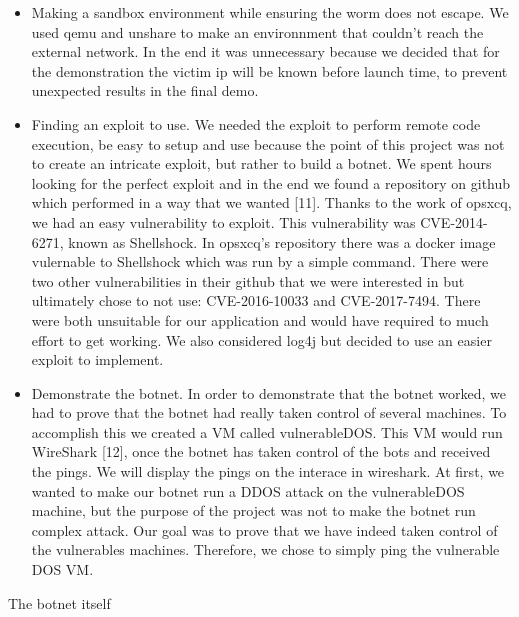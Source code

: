 \documentclass[../main.tex]{subfiles}
\begin{document}
    \begin{itemize}

        \item Making a sandbox environment while ensuring the worm does not escape.
        We used qemu and unshare to make an environnment that couldn't reach the external network.
        In the end it was unnecessary because we decided that for the demonstration the victim ip will be known before launch time, to prevent unexpected results in the final demo. 

        \item Finding an exploit to use.
        We needed the exploit to perform remote code execution, be easy to setup and use because the point of this project was not to create an intricate exploit, but rather to build a botnet.
        We spent hours looking for the perfect exploit and in the end we found a repository on github which performed in a way that we wanted [11].
        Thanks to the work of opsxcq, we had an easy vulnerability to exploit.
        This vulnerability was CVE-2014-6271, known as Shellshock.
        In opsxcq's repository there was a docker image vulernable to Shellshock which was run by a simple command.
        There were two other vulnerabilities in their github that we were interested in but ultimately chose to not use: CVE-2016-10033 and CVE-2017-7494.
        There were both unsuitable for our application and would have required to much effort to get working. 
        We also considered log4j but decided to use an easier exploit to implement.

        \item Demonstrate the botnet.
        In order to demonstrate that the botnet worked, we had to prove that the botnet had really taken control of several machines.
        To accomplish this we created a VM called vulnerableDOS. This VM would run WireShark [12], once the botnet has taken control of the bots and received the pings. We will display the pings on the interace in wireshark.
        At first, we wanted to make our botnet run a DDOS attack on the vulnerableDOS machine, but the purpose of the project was not to make the botnet run complex attack. Our goal was to prove that we have indeed taken control of the vulnerables machines. Therefore, we chose to simply ping the vulnerable DOS VM.

    \end{itemize}

    The botnet itself 

    \vspace{10pt}
\end{document}
